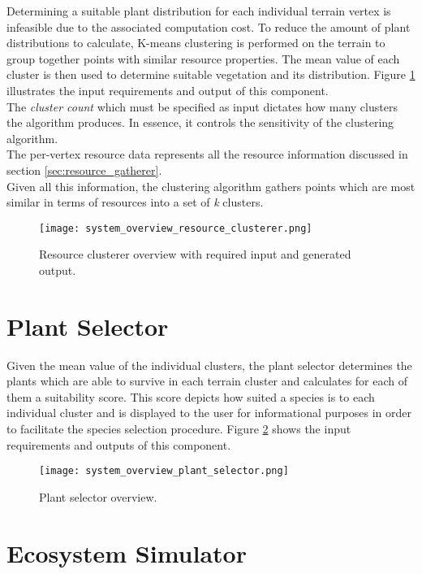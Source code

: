 Determining a suitable plant distribution for each individual terrain vertex is infeasible due to the associated computation cost. To reduce the amount of plant distributions to calculate, K-means clustering is performed on the terrain to group together points with similar resource properties. The mean value of each cluster is then used to determine suitable vegetation and its distribution. Figure \ref{fig:system_overview_resoure_clusterer} illustrates the input requirements and output of this component.\\
The \textit{cluster count} which must be specified as input dictates how many clusters the algorithm produces. In essence, it controls the sensitivity of the clustering algorithm.\\
The per-vertex resource data represents all the resource information discussed in section \ref{sec:resource_gatherer}.\\
Given all this information, the clustering algorithm gathers points which are most similar in terms of resources into a set of \textit{k} clusters. \\

\begin{figure}
\center
	\texttt{[image: system\_overview\_resource\_clusterer.png]}
	\caption{ Resource clusterer overview with required input and generated output.}	
	\label{fig:system_overview_resoure_clusterer}
\end{figure}

\section{Plant Selector}

Given the mean value of the individual clusters, the plant selector determines the plants which are able to survive in each terrain cluster and calculates for each of them a suitability score. This score depicts how suited a species is to each individual cluster and is displayed to the user for informational purposes in order to facilitate the species selection procedure. Figure \ref{fig:system_overview_plant_selector} shows the input requirements and outputs of this component.

\begin{figure}
\center
	\texttt{[image: system\_overview\_plant\_selector.png]}
	\caption{ Plant selector overview.}	
	\label{fig:system_overview_plant_selector}
\end{figure}

\section{Ecosystem Simulator}

